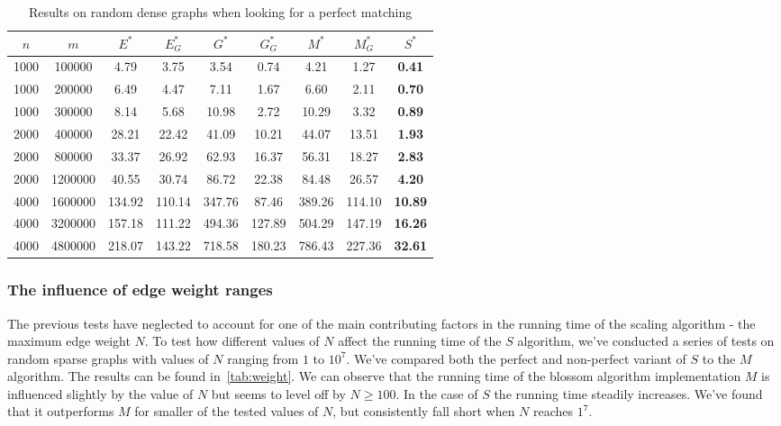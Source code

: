 \begin{table}
\centering
{} {
\begin{tabular}{
cc|ccccccc}
$n$ & $m$ & $E^*$ & $E^*_G$ & $G^*$ & $G^*_G$ & $M^*$ & $M^*_G$ & $S^*$ \\
\hline
1000 & 100000 & 4.79 & 3.75 & 3.54 & 0.74 & 4.21 & 1.27 & \textbf{0.41} \\
1000 & 200000 & 6.49 & 4.47 & 7.11 & 1.67 & 6.60 & 2.11 & \textbf{0.70} \\
1000 & 300000 & 8.14 & 5.68 & 10.98 & 2.72 & 10.29 & 3.32 & \textbf{0.89} \\
2000 & 400000 & 28.21 & 22.42 & 41.09 & 10.21 & 44.07 & 13.51 & \textbf{1.93} \\
2000 & 800000 & 33.37 & 26.92 & 62.93 & 16.37 & 56.31 & 18.27 & \textbf{2.83} \\
2000 & 1200000 & 40.55 & 30.74 & 86.72 & 22.38 & 84.48 & 26.57 & \textbf{4.20} \\
4000 & 1600000 & 134.92 & 110.14 & 347.76 & 87.46 & 389.26 & 114.10 & \textbf{10.89} \\
4000 & 3200000 & 157.18 & 111.22 & 494.36 & 127.89 & 504.29 & 147.19 & \textbf{16.26} \\
4000 & 4800000 & 218.07 & 143.22 & 718.58 & 180.23 & 786.43 & 227.36 & \textbf{32.61} \\
\end{tabular}
}
\caption{Results on random dense graphs when looking for a perfect matching}\label{tab:perfect_dense}
\end{table}

\subsubsection*{The influence of edge weight ranges}

The previous tests have neglected to account for one of the main contributing factors in the running time of the scaling algorithm - the maximum edge weight $N$. To test how different values of $N$ affect the running time of the $S$ algorithm, we've conducted a series of tests on random sparse graphs with values of $N$ ranging from $1$ to $10^7$. We've compared both the perfect and non-perfect variant of $S$ to the $M$ algorithm. The results can be found in~\ref{tab:weight}. We can observe that the running time of the blossom algorithm implementation $M$ is influenced slightly by the value of $N$ but seems to level off by $N \geq 100$. In the case of $S$ the running time steadily increases. We've found that it outperforms $M$ for smaller of the tested values of $N$, but consistently fall short when $N$ reaches $1^7$.

